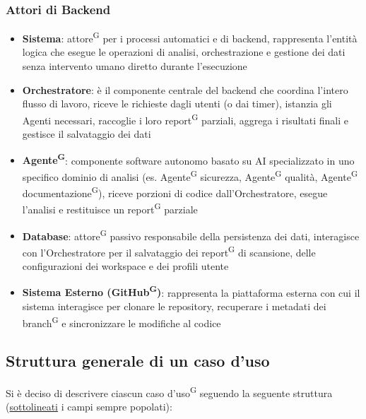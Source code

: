 \documentclass[a4paper, 11pt]{article}
\newcommand{\refterm}[1]{#1\textsuperscript{G}}
\begin{document}
\subsubsection{Attori di Backend}
    \begin{itemize}
        \item \textbf{Sistema}: attore\textsuperscript{G} per i processi automatici e di backend, rappresenta l'entità logica che esegue le operazioni di analisi, orchestrazione e gestione dei dati senza intervento umano diretto durante l'esecuzione
    
        \item \textbf{Orchestratore}: è il componente centrale del backend che coordina l'intero flusso di lavoro, riceve le richieste dagli utenti (o dai timer), istanzia gli Agenti necessari, raccoglie i loro report\textsuperscript{G} parziali, aggrega i risultati finali e gestisce il salvataggio dei dati

        \item \textbf{Agente\textsuperscript{G}}: componente software autonomo basato su AI specializzato in uno specifico dominio di analisi (es. Agente\textsuperscript{G} sicurezza, Agente\textsuperscript{G} qualità, Agente\textsuperscript{G} documentazione\textsuperscript{G}), riceve porzioni di codice dall'Orchestratore, esegue l'analisi e restituisce un report\textsuperscript{G} parziale
        
        \item \textbf{Database}: attore\textsuperscript{G} passivo responsabile della persistenza dei dati, interagisce con l'Orchestratore per il salvataggio dei report\textsuperscript{G} di scansione, delle configurazioni dei workspace e dei profili utente

        \item \textbf{Sistema Esterno (GitHub\textsuperscript{G})}: rappresenta la piattaforma esterna con cui il sistema interagisce per clonare le repository, recuperare i metadati dei branch\textsuperscript{G} e sincronizzare le modifiche al codice
    \end{itemize}

\subsection{Struttura generale di un caso d'uso}
Si è deciso di descrivere ciascun \refterm{caso d'uso} seguendo la seguente struttura (\underline{sottolineati} i campi sempre popolati):
\end{document}
